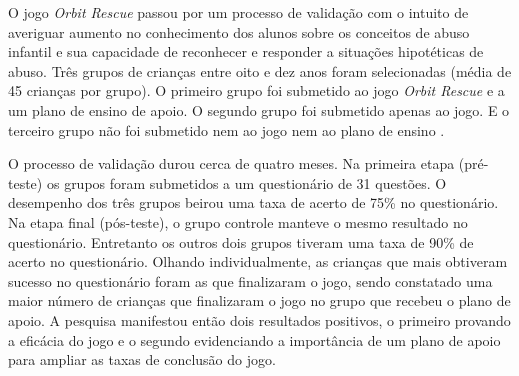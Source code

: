 




\vspace{-0.1cm}

O jogo \textit{Orbit Rescue} passou por um processo de validação com o intuito de averiguar aumento no conhecimento dos alunos sobre os conceitos de abuso infantil e sua capacidade de reconhecer e responder a situações hipotéticas de abuso. Três grupos de crianças entre oito e dez anos foram selecionadas (média de 45 crianças por grupo). O primeiro grupo foi submetido ao jogo \textit{Orbit Rescue} e a um plano de ensino de apoio. O segundo grupo foi submetido apenas ao jogo. E o terceiro grupo não foi submetido nem ao jogo nem ao plano de ensino \cite{jones2020serious}.

\vspace{-0.1cm}

O processo de validação durou cerca de quatro meses. Na primeira etapa (pré-teste) os grupos foram submetidos a um questionário de 31 questões. O desempenho dos três grupos beirou uma taxa de acerto de 75\% no questionário. Na etapa final (pós-teste), o grupo controle manteve o mesmo resultado no questionário. Entretanto os outros dois grupos tiveram uma taxa de 90\% de acerto no questionário. Olhando individualmente, as crianças que mais obtiveram sucesso no questionário foram as que finalizaram o jogo, sendo constatado uma maior número de crianças que finalizaram o jogo no grupo que recebeu o plano de apoio. A pesquisa manifestou então dois resultados positivos, o primeiro provando a eficácia do jogo e o segundo evidenciando a importância de um plano de apoio para ampliar as taxas de conclusão do jogo. 


